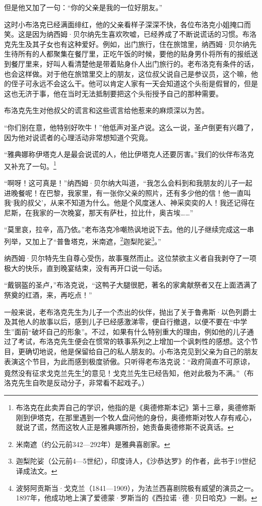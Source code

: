 \par 但是他又加了一句：“你的父亲是我的一位好朋友。”
\par 这时小布洛克已经满面绯红，他的父亲看样子深深不快，各位布洛克小姐掩口而笑。这是因为纳西姆·贝尔纳先生喜欢吹嘘，已经养成了不断说谎话的习惯。布洛克先生及其子女也有这种爱好。例如，出门旅行，住在旅馆里，纳西姆·贝尔纳先生待所有的人都聚集在餐厅里，正吃午饭的时候，要他的贴身男仆将所有的报纸送到餐厅里来，好叫人看清楚他是带着贴身仆人出门旅行的。老布洛克有条件的话，也会这样做。对于他在旅馆里交上的朋友，这位叔父说自己是参议员，这个嘛，他的侄子可永远不会这么干。他可以肯定人家有一天会知道这个头衔是假冒的，但是这也无济于事，他在当时无法抵制要把这个头衔授予自己的那种需要。
\par 布洛克先生对他叔父的谎言和这些谎言给他惹来的麻烦深以为苦。
\par “你们别在意，他特别好吹牛！”他低声对圣卢说。这么一说，圣卢倒更有兴趣了，因为他对说谎者的心理活动非常想知道个究竟。
\par “雅典娜称伊塔克人是最会说谎的人，他比伊塔克人还要厉害。”我们的伙伴布洛克又补充了一句。\footnote{布洛克在此卖弄自己的学识，他指的是《奥德修斯本记》第十三章，奥德修斯刚到伊塔克，在那里遇到一个牧人盘问他的身份，奥德修斯对牧人存有戒心，就说了谎，然而这牧人正是雅典娜所扮，她责备奥德修斯不说真话。}
\par “啊呀！这可真是！”纳西姆·贝尔纳大叫道，“我怎么会料到和我朋友的儿子一起进晚餐呢！在巴黎，我家里，有一张你父亲的照片，还有多少他的信！他一直叫我‘我的叔父’，从来不知道为什么。他是个风度迷人、神采奕奕的人！我还记得在尼斯，在我家的一次晚宴，那天有萨杜，拉比什，奥吉埃……”
\par “莫里哀，拉辛，高乃依。”老布洛克冷嘲热讽地说下去。他的儿子继续完成这一串列举，又加上了“普鲁塔克，米南遮，\footnote{米南遮（约公元前342—292年）是雅典喜剧家。}迦梨陀娑\footnote{迦梨陀娑（公元前4—5世纪），印度诗人，《沙恭达罗》的作者，此书于19世纪译成法文。}。”
\par 纳西姆·贝尔特先生自尊心受伤，故事戛然而止。这位禁欲主义者自我剥夺了一项极大的快乐，直到晚宴结束，没有再开口说一句话。
\par “戴钢盔的圣卢，”布洛克说，“这鸭子大腿很肥，著名的家禽献祭者又在上面洒满了祭奠的红酒，来，再吃点！”
\par 一般来说，老布洛克先生为儿子一个杰出的伙伴，抛出了关于鲁弗斯·以色列爵士及其他人的故事以后，感到儿子已经感激涕零，便自行撤退，以便不要在“中学生”面前“破坏自己的形象”。不过，如果有什么特别重大的理由，例如他的儿子通过了考试，布洛克先生便会在惯常的轶事系列之上增加一个讽刺性的感想。这个节目，更确切地说，他是保留给自己的私人朋友的。小布洛克见到父亲为自己的朋友表演这个节目，为此而感到极度骄傲。只听得老布洛克说：“政府简直不可原谅，竟然没有征求戈克兰先生\footnote{波努阿贡斯当·戈克兰（1841—1909），为法兰西喜剧院极有威望的演员之一。1897年，他成功地上演了爱德蒙·罗斯当的《西拉诺·德·贝日哈克》一剧。}的意见！戈克兰先生已经告知，他对此极为不满。”（布洛克先生自吹是反动分子，非常看不起戏子。）
